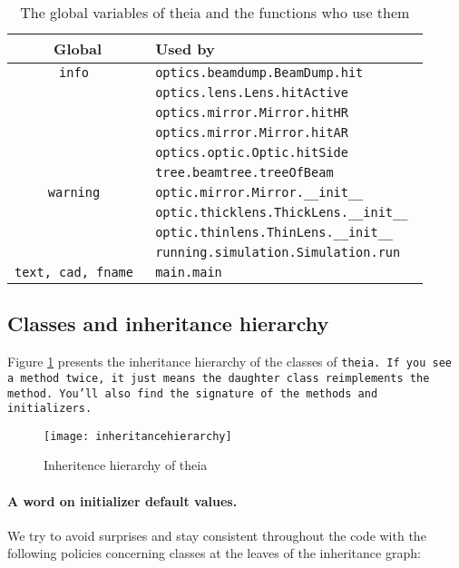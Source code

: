 \documentclass{article}
\begin{document}
\begin{table}[h]
\begin{center}

\begin{tabular}{|c | l |}
\hline
\textbf{Global} & \textbf{Used by} \\ \hline \hline

\tt{info} & \tt{optics.beamdump.BeamDump.hit} \\
& \tt{optics.lens.Lens.hitActive} \\
& \tt{optics.mirror.Mirror.hitHR} \\
& \tt{optics.mirror.Mirror.hitAR} \\
& \tt{optics.optic.Optic.hitSide} \\
& \tt{tree.beamtree.treeOfBeam} \\ \hline

\tt{warning} & \tt{optic.mirror.Mirror.\_\_init\_\_} \\
& \tt{optic.thicklens.ThickLens.\_\_init\_\_} \\
& \tt{optic.thinlens.ThinLens.\_\_init\_\_} \\
& \tt{running.simulation.Simulation.run} \\ \hline

\tt{text, cad, fname} & \tt{main.main} \\ \hline

\end{tabular}
\caption{The global variables of theia and the functions who use them}
\label{globals}
\end{center}
\end{table}
\subsection{Classes and inheritance hierarchy}
Figure \ref{inheritancehierarchy} presents the inheritance hierarchy of the classes of \tt{theia}. If you see a method twice, it just means the daughter class reimplements the method. You'll also find the signature of the methods and  initializers.

\begin{figure}[h]
\begin{center}
\texttt{[image: inheritancehierarchy]}
\caption{Inheritence hierarchy of theia}
\label{inheritancehierarchy}
\end{center}
\end{figure}
\paragraph{A word on initializer default values.}We try to avoid surprises and stay consistent throughout the code with the following policies concerning classes at the leaves of the inheritance graph:
\end{document}
